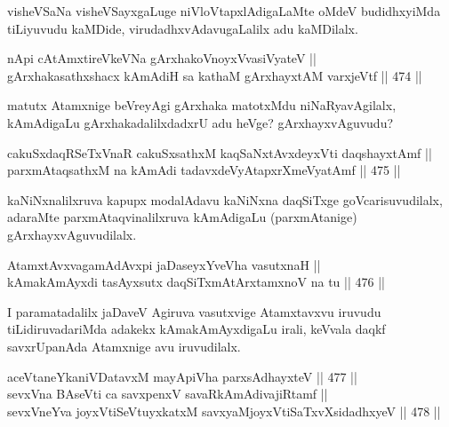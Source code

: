 \begin{artha}
visheVSaNa visheVSayxgaLuge niVloVtapxlAdigaLaMte oMdeV budidhxyiMda
tiLiyuvudu kaMDide, virudadhxvAdavugaLalilx adu kaMDilalx.
\end{artha}

\begin{shl}
nApi cA\s \s tAmxtireVkeVNa gArxhakoV\s noyxV\s vasiVyateV || \\
gArxhakasathxshacx kAmAdiH sa kathaM gArxhayxtAM varxjeVtf \hfill || 474 ||  
\end{shl}

\begin{artha}
matutx Atamxnige beVreyAgi gArxhaka matotxMdu niNaRyavAgilalx,
kAmAdigaLu gArxhakadalilxdadxrU adu heVge? gArxhayxvAguvudu?
\end{artha}


\begin{shl}
cakuSxdaqRSeTxVnaR cakuSxsathxM kaqSaNxtAvxdeyxVti daqshayxtAmf || \\
parxmAtaqsathxM na kAmAdi tadavxdeVyAtapxrXmeVyatAmf \hfill || 475 ||  
\end{shl}

\begin{artha}
kaNiNxnalilxruva kapupx modalAdavu kaNiNxna daqSiTxge
goVcarisuvudilalx, adaraMte parxmAtaqvinalilxruva kAmAdigaLu
(parxmAtanige) gArxhayxvAguvudilalx.
\end{artha}

\begin{shl}
AtamxtAvxvagamAdAvx\s pi jaDaseyxYveVha vasutxnaH ||  \\
kAmakAmAyxdi tasAyxsutx daqSiTxmAtArxtamxnoV na tu \hfill || 476 ||  
\end{shl}

\begin{artha}
I paramatadalilx jaDaveV Agiruva vasutxvige Atamxtavxvu iruvudu
tiLidiruvadariMda adakekx kAmakAmAyxdigaLu irali, keVvala daqkf
savxrUpanAda Atamxnige avu iruvudilalx.
\end{artha}


\begin{shl}
aceVtaneYkaniVDatavxM mayA\s piVha parxsAdhayxteV \hfill || 477 ||  \\
sevxVna BAseVti ca savxpenxV savaRkAmAdivajiRtamf || \\
sevxVneYva joyxVtiSeVtuyxkatxM savxyaMjoyxVtiSaTxvXsidadhxyeV \hfill || 478 ||  
\end{shl}

